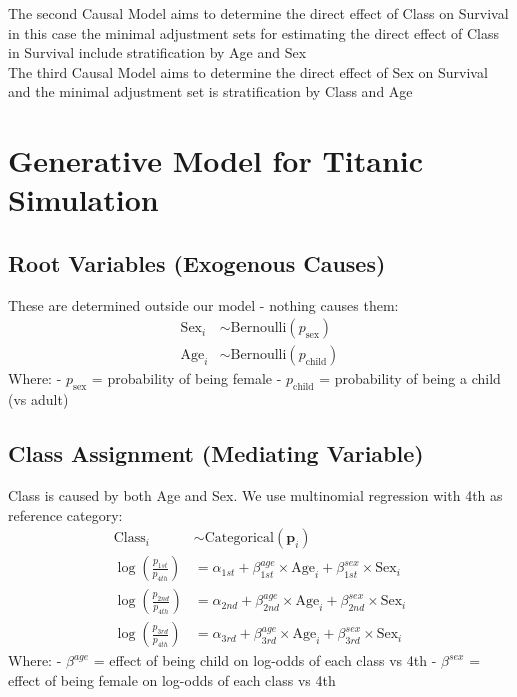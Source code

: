 \documentclass[12pt]{article}
\begin{document}
The second Causal Model aims to determine the direct effect of Class on Survival in this case the minimal adjustment sets for estimating the direct effect of Class in Survival include stratification by Age and Sex\\


The third Causal Model aims to determine the direct effect of Sex on Survival and the minimal adjustment set is stratification by Class and Age\\

\section{Generative Model for Titanic Simulation}

\subsection{Root Variables (Exogenous Causes)}
These are determined outside our model - nothing causes them:
\begin{align*}
	\text{Sex}_i &\sim \text{Bernoulli}(p_{\text{sex}}) \\
	\text{Age}_i &\sim \text{Bernoulli}(p_{\text{child}})
\end{align*}
Where: 
- $p_{\text{sex}}$ = probability of being female
- $p_{\text{child}}$ = probability of being a child (vs adult)

\subsection{Class Assignment (Mediating Variable)}
Class is caused by both Age and Sex. We use multinomial regression with 4th as reference category:
\begin{align*}
	\text{Class}_i &\sim \text{Categorical}(\mathbf{p}_i) \\
	\log\left(\frac{p_{1st}}{p_{4th}}\right) &= \alpha_{1st} + \beta_{1st}^{age} \times \text{Age}_i + \beta_{1st}^{sex} \times \text{Sex}_i \\
	\log\left(\frac{p_{2nd}}{p_{4th}}\right) &= \alpha_{2nd} + \beta_{2nd}^{age} \times \text{Age}_i + \beta_{2nd}^{sex} \times \text{Sex}_i \\
	\log\left(\frac{p_{3rd}}{p_{4th}}\right) &= \alpha_{3rd} + \beta_{3rd}^{age} \times \text{Age}_i + \beta_{3rd}^{sex} \times \text{Sex}_i
\end{align*}
Where:
- $\beta^{age}$ = effect of being child on log-odds of each class vs 4th
- $\beta^{sex}$ = effect of being female on log-odds of each class vs 4th
\end{document}

